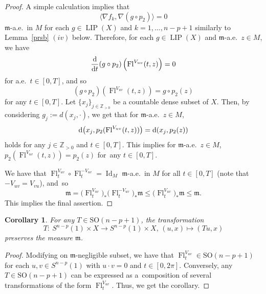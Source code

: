 \documentclass[10pt,a4paper]{amsart}
\numberwithin{equation}{section}
\newtheorem{Cor}[Thm]{Corollary}
\theoremstyle{definition}
\newcommand{\Id}{\operatorname{Id}}
\newcommand{\LIP}{\operatorname{LIP}}
\newcommand{\Fl}{\operatorname{Fl}}
\newcommand{\Z}{\mathbb{Z}}
\newcommand{\mf}{\mathfrak{m}}
\begin{document}
\begin{proof}
{}


A simple calculation implies that
\[
\langle \nabla f_k,\nabla (g\circ p_2)\rangle=0
\]
$\mf$-a.e.\ in $M$ for each $g\in \LIP(X)$ and $k=1,\ldots, n-p+1$ similarly to Lemma~\ref{prsb} $(iv)$ below.
Therefore, for each $g\in \LIP(X)$ and $\mf$-a.e.\ $z\in M$, we have
\[
\frac{\rm d}{{\rm d} t}(g\circ p_2) \left(\Fl^{V_{u v}}(t,z)\right)=0
\]
for a.e.\ $t\in [0,T]$, and so
\[
(g\circ p_2) \left(\Fl^{V_{u v}}(t,z)\right)=g\circ p_2(z)
\]
for any $t\in[0,T]$.
Let $\{x_j\}_{j\in \Z_{>0}}$ be a countable dense subset of $X$.
Then, by considering $g_j:=d(x_j,\cdot)$, we get that for $\mf$-a.e.\ $z\in M$,
\[
{\rm d}\big(x_j,p_2(\Fl^{V_{u v}}(t,z))\big)={\rm d}(x_j,p_2(z))
\]
holds
for any $j\in\Z_{>0}$ and $t\in [0,T]$.
This implies for $\mf$-a.e.\ $z\in M$,
$p_2\left(\Fl^{V_{u v}}(t,z)\right)=p_2(z)$ for~any $t\in [0,T]$.

We have that $\Fl^{V_{u v}}_t\circ \Fl_t^{-V_{u v}}=\Id_M$ $\mf$-a.e.\ in $M$ for all $t\in[0,T]$ (note that $-V_{u v}=V_{v u}$), and~so
\[
\mf=\big(\Fl^{V_{u v}}_t\big)_\ast \big(\Fl_t^{-V_{u v}}\big)_\ast \mf
\leq \big(\Fl_t^{V_{u v}}\big)_\ast\mf\leq \mf.
\]
This implies the final assertion.
\end{proof}

\begin{Cor}\label{presm}
For any $T\in \mathrm{SO}(n-p+1)$, the transformation
\[
T\colon\ S^{n-p}(1)\times X\to S^{n-p}(1)\times X,\, (u,x)\mapsto (T u, x)
\]
preserves the measure $\mf$.
\end{Cor}
\begin{proof}
Modifying on $\mf$-negligible subset, we have that $\Fl^{V_{u v}}_t\in \mathrm{SO}(n-p+1)$ for each $u,v\in S^{n-p}(1)$ with $u\cdot v=0$ and $t\in [0,2\pi]$.
Conversely, any $T\in \mathrm{SO}(n-p+1)$ can be expressed as a~composition of several transformations of the form $\Fl^{V_{u v}}_t$.
Thus, we get the corollary.
\end{proof}
\end{document}
